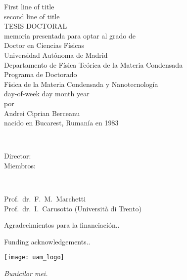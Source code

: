 \thispagestyle{empty}

\begin{center}
{\Huge  First line of title \\ second line of title\\}
\vspace{5.4cm}
{\large{TESIS DOCTORAL}}\\
\vspace{2.6cm}
{ {\sc memoria presentada para optar al grado de \\ Doctor en Ciencias F\'{i}sicas\\
Universidad Aut\'{o}noma de Madrid\\
Departamento de F\'{i}sica Te\'{o}rica de la Materia Condensada\\
Programa de Doctorado\\
F\'{i}sica de la Materia Condensada y Nanotecnolog\'{i}a\\
day-of-week day month year\\
$\,$\\$\,$\\por\\$\,$\\$\,$\\}
{\LARGE{Andrei Ciprian Berceanu}}\\$\,$ \\{\sc nacido en Bucarest, Ruman\'{i}a en 1983}}
\end{center}
\newpage

\thispagestyle{empty}
\\[2ex]
  \parbox[t]{2.8cm}{Director:\\
                  Miembros:
}~\parbox[t]{11cm}{Prof.\ dr.\ F.\ M.\ Marchetti \\
Prof.\ dr.\ I.\ Carusotto (Universit\`{a} di Trento)\\
}\newline


\vfill


\noindent
\begin{otherlanguage}{spanish}
Agradecimientos para la financiaci\'{o}n..
\end{otherlanguage}
\vspace{\baselineskip}


\noindent
Funding acknowledgements..
\vspace{\baselineskip}

\centerline{\texttt{[image: uam\_logo]}}

\newpage

\thispagestyle{empty}

\phantom{text}

\vspace{2cm}

\begin{flushright}
  {\em Bunicilor mei.}
\end{flushright}

\newpage

\thispagestyle{empty}
